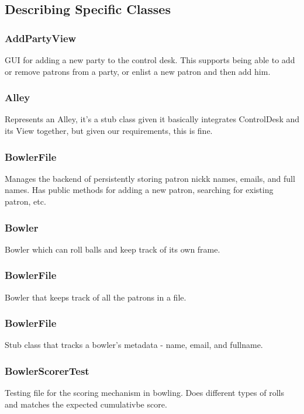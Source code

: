 \subsection{Describing Specific Classes}

\subsubsection{AddPartyView}
GUI for adding a new party to the control desk. This supports being able to add or remove patrons from a party, or enlist a new patron and then add him.

\subsubsection{Alley}
Represents an Alley, it's a stub class given it basically integrates ControlDesk and its View together, but given our requirements, this is fine.

\subsubsection{BowlerFile}
Manages the backend of persistently storing patron nickk names, emails, and full names. Has public methods for adding a new patron, searching for existing patron, etc.

\subsubsection{Bowler}
Bowler which can roll balls and keep track of its own frame.

\subsubsection{BowlerFile}
Bowler that keeps track of all the patrons in a file.

\subsubsection{BowlerFile}
Stub class that tracks a bowler's metadata - name, email, and fullname.

\subsubsection{BowlerScorerTest}
Testing file for the scoring mechanism in bowling. Does different types of rolls and matches the expected cumulativbe score.

